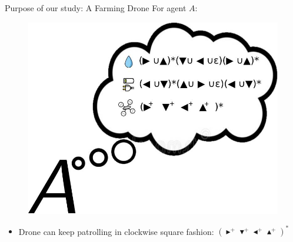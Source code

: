 \documentclass{beamer}
\newcommand{\obsright}{\blacktriangleright}
\newcommand{\obsleft}{\blacktriangleleft}
\newcommand{\obsup}{\blacktriangle}
\newcommand{\obsdown}{\blacktriangledown}
\newcommand{\exppatrol}{(\obsright^+ \obsdown^+ \obsleft^+ \obsup^+)^*}
\begin{document}
\begin{frame}{Purpose of our study: A Farming Drone}
    For agent $A$:
    \begin{figure}
        \centering
        \includegraphics[scale=0.2]{images/A-expectall.jpg}
    \end{figure}
    \begin{itemize}
        \item Drone can keep patrolling in clockwise square fashion: $\exppatrol$
    \end{itemize}
\end{frame}
\end{document}

